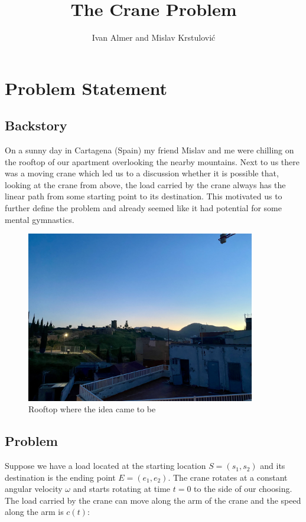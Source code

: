 \documentclass[11pt]{article}
\begin{document}
\title{The Crane Problem}
\author{Ivan Almer and Mislav Krstulović}

\maketitle

\section{Problem Statement}

\subsection{Backstory}
On a sunny day in Cartagena (Spain) my friend Mislav and me were chilling on the rooftop of our apartment overlooking the nearby mountains. Next to us there was a moving crane which led us to a discussion whether it is possible that, looking at the crane from above, the load carried by the crane always has the linear path from some starting point to its destination.
This motivated us to further define the problem and already seemed like it had potential for some mental gymnastics.

\begin{figure}[H]
\centering
\includegraphics[width=10cm]{rooftop.jpeg}
\caption{Rooftop where the idea came to be}\label{rooftop}
\end{figure}

\subsection{Problem}
Suppose we have a load located at the starting location $S = (s_1,s_2)$ and its destination is the ending point $E = (e_1,e_2)$. The crane rotates at a constant angular velocity $\omega$ and starts rotating at time $t=0$ to the side of our choosing. The load carried by the crane can move along the arm of the crane and the speed along the arm is $c(t)$:
\end{document}
